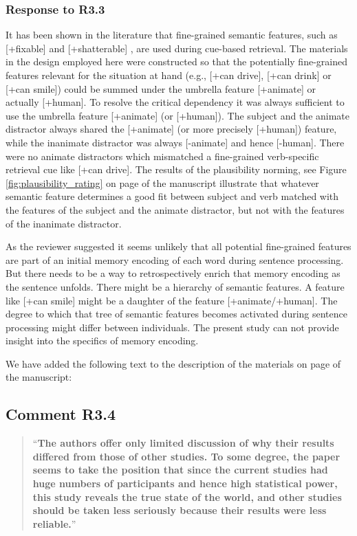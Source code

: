 \documentclass[12pt]{article}
\begin{document}
\subsubsection*{Response to R3.3}
It has been shown in the literature that fine-grained semantic features, such as [+fixable] \citep{vandyke_mcelree06} and [+shatterable] \citep{cunnings_sturt_2018retrieval}, are used during cue-based retrieval. The materials in the design employed here were constructed so that the potentially fine-grained features relevant for the situation at hand (e.g., [+can drive], [+can drink] or [+can smile]) could be summed under the umbrella feature [+animate] or actually [+human]. To resolve the critical dependency it was always sufficient to use the umbrella feature [+animate] (or [+human]). The subject and the animate distractor always shared the [+animate] (or more precisely [+human]) feature, while the inanimate distractor was always [-animate] and hence [-human]. There were no animate distractors which mismatched a fine-grained verb-specific retrieval cue like [+can drive]. The results of the plausibility norming, see Figure \ref{fig:plausibility_rating} on page \pageref{fig:plausibility_rating} of the manuscript illustrate that whatever semantic feature determines a good fit between subject and verb matched with the features of the subject and the animate distractor, but not with the features of the inanimate distractor. 

As the reviewer suggested it seems unlikely that all potential fine-grained features are part of an initial memory encoding of each word during sentence processing. But there needs to be a way to retrospectively enrich that memory encoding as the sentence unfolds. There might be a hierarchy of semantic features. A feature like [+can smile] might be a daughter of the feature [+animate/+human]. The degree to which that tree of semantic features becomes activated during sentence processing might differ between individuals. The present study can not provide insight into the specifics of memory encoding. 

We have added the following text to the description of the materials on page \pageref{semantic_features_encoding} of the manuscript:

\begin{quote}
\end{quote}

\subsection*{Comment R3.4}
\begin{quote}
``\textbf{The authors offer only limited discussion of why their results differed from those of other studies. To some degree, the paper seems to take the position that since the current studies had huge numbers of participants and hence high statistical power, this study reveals the true state of the world, and other studies should be taken less seriously because their results were less reliable.}''
\end{quote}
\end{document}
